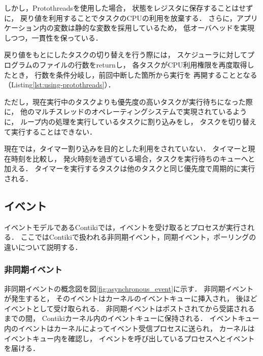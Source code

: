 しかし，Protothreadsを使用した場合，
状態をレジスタに保存することはせずに，
戻り値を利用することでタスクのCPUの利用を放棄する．
さらに，アプリケーション内の変数は静的な変数を採用しているため，
低オーバヘッドを実現しつつ，一貫性を保っている．

戻り値をもとにしたタスクの切り替えを行う際には，
スケジューラに対してプログラムのファイルの行数をreturnし，
各タスクがCPU利用権限を再度取得したとき，
行数を条件分岐し，前回中断した箇所から実行を
再開することとなる（Listing\ref{lst:using-protothreads}）．

ただし，現在実行中のタスクよりも優先度の高いタスクが実行待ちになった際に，
他のマルチスレッドのオペレーティングシステムで実現されているように，
ループ内の処理を実行しているタスクに割り込みをし，
タスクを切り替えて実行することはできない．

現在では，タイマー割り込みを目的とした利用をされていない．
タイマーと現在時刻を比較し，
発火時刻を過ぎている場合，タスクを実行待ちのキューへと加える．
タイマーを実行するタスクは他のタスクと同じ優先度で周期的に実行される．




\subsection{イベント}
イベントモデルであるContikiでは，イベントを受け取るとプロセスが実行される．
ここではContikiで扱われる非同期イベント，同期イベント，ポーリングの違いについて説明する．

\subsubsection{非同期イベント}

\vspace{0.5em}非同期イベントの概念図を図\ref{fig:asynchronous_event}に示す．
非同期イベントが発生すると，
そのイベントはカーネルのイベントキューに挿入され，
後ほどイベントとして受け取られる．
非同期イベントはポストされてから受諾されるまでの間，
Contikiカーネル内のイベントキューに保持される．
イベントキュー内のイベントはカーネルによってイベント受信プロセスに送られ，
カーネルはイベントキュー内を確認し，
イベントを呼び出しているプロセスへとイベントを届ける．

